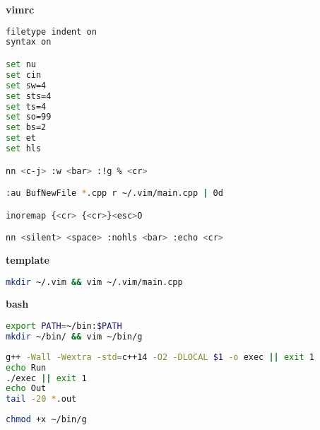 \textbf{vimrc}
\begin{lstlisting}[language=bash]
filetype indent on
syntax on

set nu
set cin
set sw=4
set sts=4
set ts=4
set so=99
set bs=2
set et
set hls

nn <c-j> :w <bar> :!g % <cr>

:au BufNewFile *.cpp r ~/.vim/main.cpp | 0d

inoremap {<cr> {<cr>}<esc>O

nn <silent> <space> :nohls <bar> :echo <cr>
\end{lstlisting} 
    
\textbf{template}    
\begin{lstlisting}[language=bash]
mkdir ~/.vim && vim ~/.vim/main.cpp  
\end{lstlisting} 

\textbf{bash} 
\begin{lstlisting}[language=bash]
export PATH=~/bin:$PATH
mkdir ~/bin/ && vim ~/bin/g
\end{lstlisting} 

\begin{lstlisting}[language=bash]
g++ -Wall -Wextra -std=c++14 -O2 -DLOCAL $1 -o exec || exit 1
echo Run
./exec || exit 1
echo Out
tail -20 *.out
\end{lstlisting} 

\begin{lstlisting}[language=bash]
chmod +x ~/bin/g
\end{lstlisting} 
